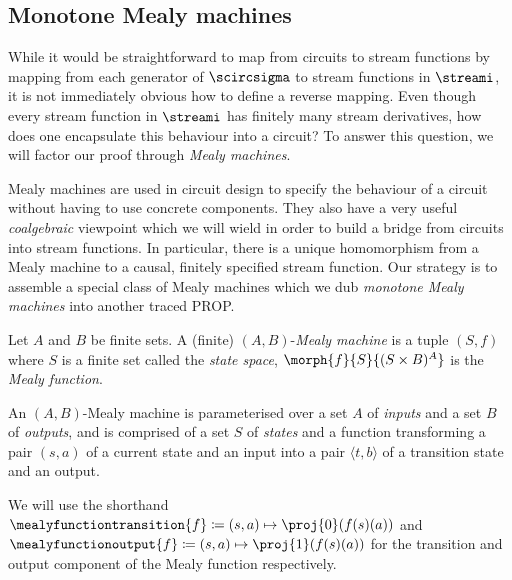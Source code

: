 \documentclass{lmcs}
\begin{document}
\subsection{Monotone Mealy machines}\label{sec:mealy}

While it would be straightforward to map from circuits to stream functions by
mapping from each generator of \(\scircsigma\) to stream functions in
\(\streami\), it is not immediately obvious how to define a reverse mapping.
Even though every stream function in \(\streami\) has finitely many stream
derivatives, how does one encapsulate this behaviour into a circuit?
To answer this question, we will factor our proof through
\emph{Mealy machines}.

Mealy machines are used in circuit design to specify the behaviour of a circuit
without having to use concrete components.  They also have
a very useful \emph{coalgebraic} viewpoint which we will wield in order to
build a bridge from circuits into stream functions.
In particular, there is a unique homomorphism from a Mealy machine to a causal,
finitely specified stream function.
Our strategy is to assemble a special class of Mealy machines which we dub
\emph{monotone Mealy machines} into another traced PROP.

\begin{defi}\label{def:mealy}
    Let \(A\) and \(B\) be finite sets.
    A (finite) \((A,B)\)-\emph{Mealy machine} is a tuple \((S, f)\) where
    \(S\) is a finite set called the \emph{state space},
    \(\morph{f}{S}{(S \times B)^A}\) is the \emph{Mealy function}.
\end{defi}

An \((A,B)\)-Mealy machine is parameterised over a set \(A\) of \emph{inputs}
and a set \(B\) of \emph{outputs}, and is comprised of a set \(S\) of
\emph{states} and a function transforming a pair \((s, a)\) of a current state
and an input into a pair \(\langle{t,b}\rangle\) of a transition state and an
output.

\begin{nota}
    We will use the shorthand \(
    \mealyfunctiontransition{f} \coloneqq (s, a) \mapsto \proj{0}(f(s)(a))
    \) and \(
    \mealyfunctionoutput{f} \coloneqq (s, a) \mapsto \proj{1}(f(s)(a))
    \) for the transition and output component of the Mealy function respectively.
\end{nota}
\end{document}
